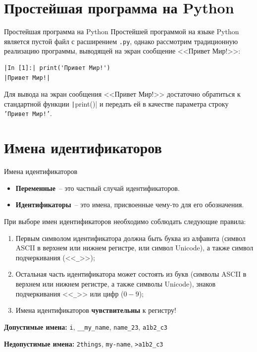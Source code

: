 \documentclass[aspectratio=169, mathserif]{beamer}	%
\begin{document}
\section{Простейшая программа на Python}

\begin{frame}[fragile]{Простейшая программа на Python}
\scriptsize
Простейшей программой на языке Python является пустой файл с расширением \texttt{.py}, однако рассмотрим традиционную реализацию программы, выводящей на экран сообщение <<Привет Мир!>>:

\begin{verbatim}
|In [1]:| print('Привет Мир!')
|Привет Мир!|
\end{verbatim}

Для вывода на экран сообщения <<Привет Мир!>> достаточно обратиться к стандартной функции \texttt|print()| и передать ей в качестве параметра строку \texttt{'Привет Мир!'}.
\vfill
\end{frame}


\section{Имена идентификаторов}
\sectionframe

\begin{frame}[fragile]{Имена идентификаторов}
\scriptsize
\begin{itemize}
	\item \textcolor{extraorange}{\textbf{Переменные}}~-- это частный случай идентификаторов.
	\item \textcolor{extraorange}{\textbf{Идентификаторы}}~-- это имена, присвоенные чему-то для его обозначения.
\end{itemize}
\bigskip
При выборе имен идентификаторов необходимо соблюдать следующие правила:
\begin{enumerate}
	\item Первым символом идентификатора должна быть буква из алфавита (символ ASCII в верхнем или нижнем регистре, или символ Unicode), а также символ подчеркивания (<<\texttt{\_}>>);
	\item Остальная часть идентификатора может состоять из букв (символы ASCII в верхнем или нижнем регистре, а также символы Unicode), знаков подчеркивания <<\texttt{\_}>> или цифр ($0-9$);
	\item Имена идентификаторов \alert{\textbf{чувствительны}} к регистру!
\end{enumerate}
\bigskip
\alert{\textbf{Допустимые имена:}} \texttt{i}, \texttt{\_\_my\_name}, \texttt{name\_23}, \texttt{a1b2\_c3}

\alert{\textbf{{\color{red}Недопустимые имена:}}} \texttt{2things}, \texttt{my-name}, \texttt{>a1b2\_c3}
\vfill
\end{frame}
\end{document}
